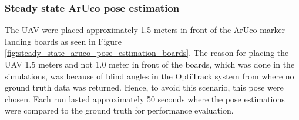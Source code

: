 \documentclass[../Head/report.tex]{subfiles}
\begin{document}
\subsubsection{Steady state ArUco pose estimation}
\label{sec:steady_state_aruco_pose_estimation}

The UAV were placed approximately 1.5 meters in front of the ArUco marker landing boards as seen in Figure \ref{fig:steady_state_aruco_pose_estimation_boards}. The reason for placing the UAV 1.5 meters and not 1.0 meter in front of the boards, which was done in the simulations, was because of blind angles in the OptiTrack system from where no ground truth data was returned. Hence, to avoid this scenario, this pose were chosen. Each run lasted approximately 50 seconds where the pose estimations were compared to the ground truth for performance evaluation.
\end{document}
